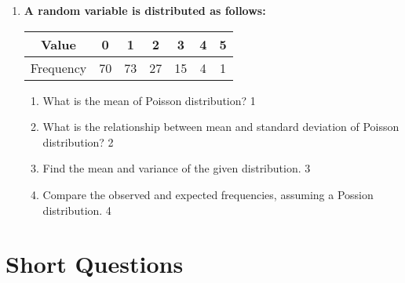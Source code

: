 \documentclass[a4paper,oneside, margin=1.4in]{book}
\begin{document}
\begin{enumerate}
 \item
	  \textbf{A random variable is distributed as follows:} 
	  
	  \begin{table}[h]
	  \centering
\begin{tabular}{ccccccc}
Value & 0 & 1 & 2 & 3 & 4 & 5 \\ \hline
Frequency & 70 & 73 & 27 & 15 & 4 & 1
\end{tabular}
\end{table}
  
  \begin{enumerate}
    \item
	What is the mean of Poisson distribution? \hfill 1
    \item
	What is the relationship between mean and standard deviation of Poisson distribution? \hfill 2
    \item  
	Find the mean and variance of the given distribution. \hfill 3
    \item
	Compare the observed and expected frequencies, assuming a Possion distribution. \hfill 4
  \end{enumerate}

  \end{enumerate}

\section{Short Questions}
\end{document}
